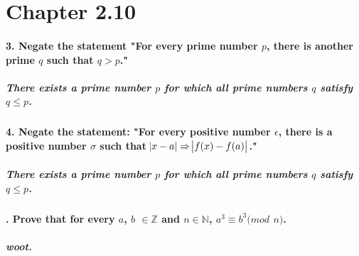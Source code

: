 \documentclass[letterpaper,12pt]{article}
\author{Sam Hemann}
\title{MATH 201 Homework ##5}
\date{2/11/2016}
\begin{document}
\newcommand{\N}{\mathbb{N}}
\newcommand{\Z}{\mathbb{Z}}

\section*{Chapter 2.10}

\paragraph{\bf
  3. Negate the statement "For every prime number $p$, there
  is another prime $q$ such that $q > p$."
}
\subparagraph{\normalfont
  There exists a prime number $p$ for which all prime numbers $q$
  satisfy $q \leq p$.
}

\paragraph{\bf
  4. Negate the statement: "For every positive number $\epsilon$, there
  is a positive number $\sigma$ such that $\abs{x-a} \Rightarrow
  \abs{f(x)-f(a)}$."
}
\subparagraph{\normalfont
  There exists a prime number $p$ for which all prime numbers $q$ satisfy
  $q \leq p$.
}

\paragraph{. Prove that for every $a$, $b$ $\in \Z$ and $n \in \N$, $a^{3} \equiv
  b^{3} (mod$ $ n)$.
}
\subparagraph{\normalfont
  woot.
}
\end{document}
